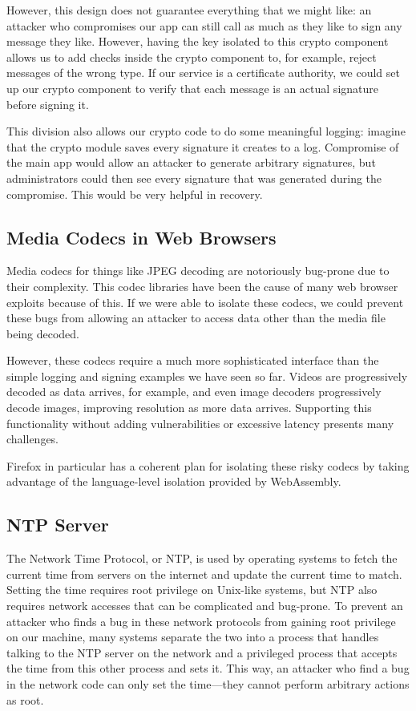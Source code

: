 However, this design does not guarantee everything that we might like: an attacker who compromises our app can still call  as much as they like to sign any message they like. However, having the key isolated to this crypto component allows us to add checks inside the crypto component to, for example, reject messages of the wrong type. If our service is a certificate authority, we could set up our crypto component to verify that each message is an actual signature before signing it.

This division also allows our crypto code to do some meaningful logging: imagine that the crypto module saves every signature it creates to a log. Compromise of the main app would allow an attacker to generate arbitrary signatures, but administrators could then see every signature that was generated during the compromise. This would be very helpful in recovery.

\subsection{Media Codecs in Web Browsers}\label{sec:split:codec}
Media codecs for things like JPEG decoding are notoriously bug-prone due to their complexity. This codec libraries have been the cause of many web browser exploits because of this. If we were able to isolate these codecs, we could prevent these bugs from allowing an attacker to access data other than the media file being decoded.

However, these codecs require a much more sophisticated interface than the simple logging and signing examples we have seen so far. Videos are progressively decoded as data arrives, for example, and even image decoders progressively decode images, improving resolution as more data arrives. Supporting this functionality without adding vulnerabilities or excessive latency presents many challenges.

Firefox in particular has a coherent plan for isolating these risky codecs by taking advantage of the language-level isolation provided by WebAssembly.

\subsection{NTP Server}
The Network Time Protocol, or NTP, is used by operating systems to fetch the current time from servers on the internet and update the current time to match. Setting the time requires root privilege on Unix-like systems, but NTP also requires network accesses that can be complicated and bug-prone. To prevent an attacker who finds a bug in these network protocols from gaining root privilege on our machine, many systems separate the two into a process that handles talking to the NTP server on the network and a privileged process that accepts the time from this other process and sets it. This way, an attacker who find a bug in the network code can only set the time---they cannot perform arbitrary actions as root.

